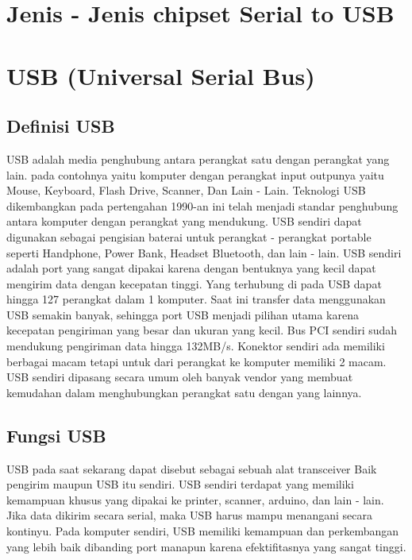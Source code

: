 
\section{Jenis - Jenis chipset Serial to USB}
\section{USB (Universal Serial Bus)}

\subsection{Definisi USB}
USB adalah media penghubung antara perangkat satu dengan perangkat yang lain. pada contohnya yaitu komputer dengan perangkat input outpunya yaitu Mouse, Keyboard, Flash Drive, Scanner, Dan Lain - Lain.
Teknologi USB dikembangkan pada pertengahan 1990-an ini telah menjadi standar penghubung antara komputer dengan perangkat yang mendukung. USB sendiri dapat digunakan sebagai pengisian baterai untuk perangkat - perangkat portable seperti Handphone, Power Bank, Headset Bluetooth, dan lain - lain.
USB sendiri adalah port yang sangat dipakai karena dengan bentuknya yang kecil dapat mengirim data dengan kecepatan tinggi. Yang terhubung di pada USB dapat hingga 127 perangkat dalam 1 komputer. Saat ini transfer data menggunakan USB semakin banyak, sehingga port USB menjadi pilihan utama karena kecepatan pengiriman yang besar dan ukuran yang kecil. Bus PCI sendiri sudah mendukung pengiriman data hingga 132MB/s. Konektor sendiri ada memiliki berbagai macam tetapi untuk dari perangkat ke komputer memiliki 2 macam. USB sendiri dipasang secara umum oleh banyak vendor yang membuat kemudahan dalam menghubungkan perangkat satu dengan yang lainnya. 

\subsection{Fungsi USB}
USB pada saat sekarang dapat disebut sebagai sebuah alat transceiver Baik pengirim maupun USB itu sendiri. USB sendiri terdapat yang memiliki kemampuan khusus yang dipakai ke printer, scanner, arduino, dan lain - lain. Jika data dikirim secara serial, maka USB harus mampu menangani secara kontinyu. Pada komputer sendiri, USB memiliki kemampuan dan perkembangan yang lebih baik dibanding port manapun karena efektifitasnya yang sangat tinggi.

